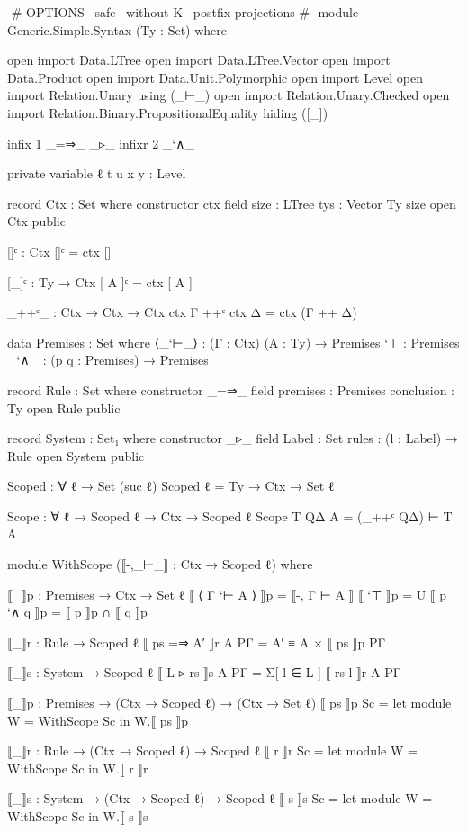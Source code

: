 \begin{code}
{-# OPTIONS --safe --without-K --postfix-projections #-}
module Generic.Simple.Syntax (Ty : Set) where

  open import Data.LTree
  open import Data.LTree.Vector
  open import Data.Product
  open import Data.Unit.Polymorphic
  open import Level
  open import Relation.Unary using (_⊢_)
  open import Relation.Unary.Checked
  open import Relation.Binary.PropositionalEquality hiding ([_])

  infix 1 _=⇒_ _▹_
  infixr 2 _`∧_

  private
    variable
      ℓ t u x y : Level

  record Ctx : Set where
    constructor ctx
    field
      {size} : LTree
      tys : Vector Ty size
  open Ctx public

  []ᶜ : Ctx
  []ᶜ = ctx []

  [_]ᶜ : Ty → Ctx
  [ A ]ᶜ = ctx [ A ]

  _++ᶜ_ : Ctx → Ctx → Ctx
  ctx Γ ++ᶜ ctx Δ = ctx (Γ ++ Δ)

  data Premises : Set where
    ⟨_`⊢_⟩ : (Γ : Ctx) (A : Ty) → Premises
    `⊤ : Premises
    _`∧_ : (p q : Premises) → Premises

  record Rule : Set where
    constructor _=⇒_
    field
      premises : Premises
      conclusion : Ty
  open Rule public

  record System : Set₁ where
    constructor _▹_
    field
      Label : Set
      rules : (l : Label) → Rule
  open System public

  Scoped : ∀ ℓ → Set (suc ℓ)
  Scoped ℓ = Ty → Ctx → Set ℓ

  Scope : ∀ {ℓ} → Scoped ℓ → Ctx → Scoped ℓ
  Scope T QΔ A = (_++ᶜ QΔ) ⊢ T A
\end{code}

\begin{code}
  module WithScope (⟦-,_⊢_⟧ : Ctx → Scoped ℓ) where

    ⟦_⟧p : Premises → Ctx → Set ℓ
    ⟦ ⟨ Γ `⊢ A ⟩ ⟧p = ⟦-, Γ ⊢ A ⟧
    ⟦ `⊤ ⟧p = U
    ⟦ p `∧ q ⟧p = ⟦ p ⟧p ∩ ⟦ q ⟧p

    ⟦_⟧r : Rule → Scoped ℓ
    ⟦ ps =⇒ A′ ⟧r A PΓ = A′ ≡ A × ⟦ ps ⟧p PΓ

    ⟦_⟧s : System → Scoped ℓ
    ⟦ L ▹ rs ⟧s A PΓ = Σ[ l ∈ L ] ⟦ rs l ⟧r A PΓ

  ⟦_⟧p : Premises → (Ctx → Scoped ℓ) → (Ctx → Set ℓ)
  ⟦ ps ⟧p Sc = let module W = WithScope Sc in W.⟦ ps ⟧p

  ⟦_⟧r : Rule → (Ctx → Scoped ℓ) → Scoped ℓ
  ⟦ r ⟧r Sc = let module W = WithScope Sc in W.⟦ r ⟧r

  ⟦_⟧s : System → (Ctx → Scoped ℓ) → Scoped ℓ
  ⟦ s ⟧s Sc = let module W = WithScope Sc in W.⟦ s ⟧s
\end{code}

